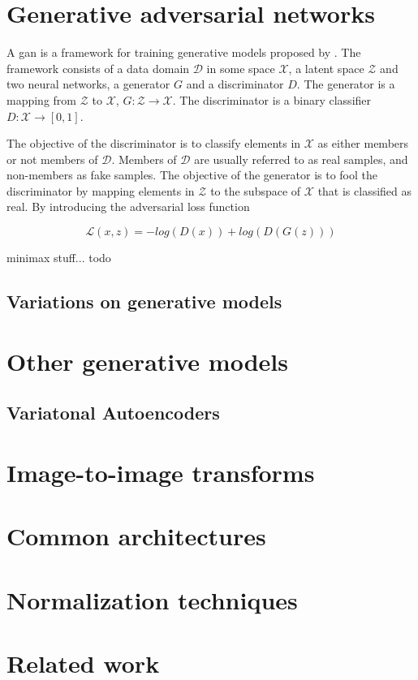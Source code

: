 \section{Generative adversarial networks}
A \acrfull{gan} is a framework for training generative models proposed by \textcite{goodfellow2014generative}. The framework consists of a data domain $\mathcal{D}$ in some space $\mathcal{X}$, a latent space $\mathcal{Z}$ and two neural networks, a generator $G$ and a discriminator $D$. The generator is a mapping from $\mathcal{Z}$ to $\mathcal{X}$, $G: \mathcal{Z} \rightarrow \mathcal{X}$. The discriminator is a binary classifier $D: \mathcal{X} \rightarrow [0, 1]$. 

The objective of the discriminator is to classify elements in $\mathcal{X}$ as either members or not members of $\mathcal{D}$. Members of $\mathcal{D}$ are usually referred to as real samples, and non-members as fake samples. The objective of the generator is to fool the discriminator by mapping elements in $\mathcal{Z}$ to the subspace of $\mathcal{X}$ that is classified as real. By introducing the adversarial loss function

\begin{equation}
    \mathcal{L}(x, z) = -log(D(x)) + log(D(G(z)))
\end{equation}

minimax stuff... todo



\subsection{Variations on generative models}

\section{Other generative models}

\subsection{Variatonal Autoencoders}

\section{Image-to-image transforms}

\section{Common architectures}

\section{Normalization techniques}

\section{Related work}




